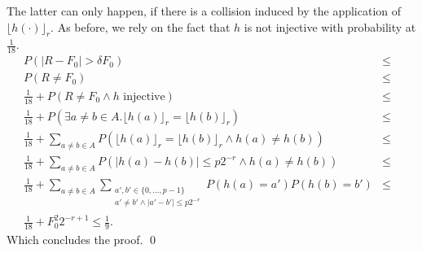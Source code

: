 \documentclass[11pt,a4paper]{article}
\newcommand{\size}[1]{\lvert#1\rvert}
\begin{document}
The latter can only happen, if there is a collision induced by the application of $\lfloor h(\cdot)\rfloor_r$. As before, we rely on the fact that $h$ is not injective with probability at $\frac{1}{18}$.
\begin{eqnarray*}
    P\left( \size{R - F_0} > \delta F_0\right) & \leq & \\
    P\left( R \neq F_0 \right) & \leq & \\
    \frac{1}{18} + P\left( R \neq F_0 \wedge h \textrm{ injective} \right) & \leq & \\
    \frac{1}{18} + P\left( \exists a \neq b \in A. \lfloor h(a) \rfloor_r = \lfloor h(b) \rfloor_r  \right) & \leq & \\
    \frac{1}{18} + \sum_{a \neq b \in A} P\left(\lfloor h(a) \rfloor_r = \lfloor h(b) \rfloor_r \wedge h(a) \neq h(b) \right) & \leq & \\
    \frac{1}{18} + \sum_{a \neq b \in A} P\left(\size{h(a) - h(b)} \leq p 2^{-r} \wedge h(a) \neq h(b) \right) & \leq & \\
    \frac{1}{18} + \sum_{a \neq b \in A} \sum_{\substack{a', b' \in \{0,\ldots, p-1\} \\  a' \neq b' \wedge \size{a'-b'} \leq p 2^{-r}}} P(h(a) = a') P(h(b)= b') & \leq & \\
    \frac{1}{18} + F_0^2 2^{-r+1} \leq \frac{1}{9} \textrm{.}
\end{eqnarray*}
Which concludes the proof. \qed

%
%
\end{document}
